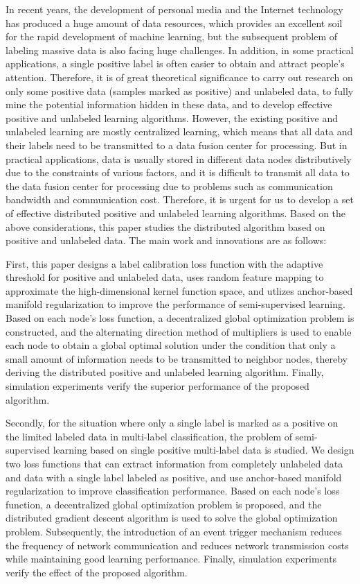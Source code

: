 \cleardoublepage
{}
In recent years, the development of personal media and the Internet technology has produced a huge amount of data resources, which provides an excellent soil for the rapid development of machine learning, but the subsequent problem of labeling massive data is also facing huge challenges.
In addition, in some practical applications, a single positive label is often easier to obtain and attract people's attention. 
Therefore, it is of great theoretical significance to carry out research on only some positive data (samples marked as positive) and unlabeled data, to fully mine the potential information hidden in these data, and to develop effective positive and unlabeled learning algorithms.
However, the existing positive and unlabeled learning are mostly centralized learning, 
which means that all data and their labels need to be transmitted to a data fusion center for processing.
But in practical applications, data is usually stored in different data nodes distributively due to the constraints of various factors, and it is difficult to transmit all data to the data fusion center for processing due to problems such as communication bandwidth and communication cost.
Therefore, it is urgent for us to develop a set of effective distributed positive and unlabeled learning algorithms.
Based on the above considerations, this paper studies the distributed algorithm based on positive and unlabeled data. 
The main work and innovations are as follows:

First, this paper designs a label calibration loss function with the adaptive threshold for positive and unlabeled data, uses random feature mapping to approximate the high-dimensional kernel function space, and utlizes anchor-based manifold regularization to improve the performance of semi-supervised learning.
Based on each node's loss function, a decentralized global optimization problem is constructed, and the alternating direction method of multipliers is used to enable each node to obtain a global optimal solution under the condition that only a small amount of information needs to be transmitted to neighbor nodes, thereby deriving the distributed positive and unlabeled learning algorithm. Finally, simulation experiments verify the superior performance of the proposed algorithm.

Secondly, for the situation where only a single label is marked as a positive on the limited labeled data in multi-label classification, the problem of semi-supervised learning based on single positive multi-label data is studied.
We design two loss functions that can extract information from completely unlabeled data and data with a single label labeled as positive, and use anchor-based manifold regularization to improve classification performance.
Based on each node's loss function, a decentralized global optimization problem is proposed, and the distributed gradient descent algorithm is used to solve the global optimization problem.
Subsequently, the introduction of an event trigger mechanism reduces the frequency of network communication and reduces network transmission costs while maintaining good learning performance. Finally, simulation experiments verify the effect of the proposed algorithm.

